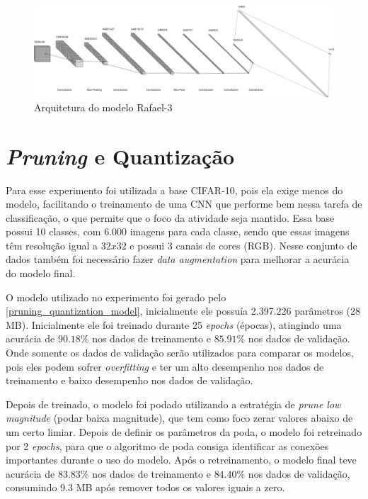 \begin{figure}
	\caption {\label{cap_resultados_rafael_3}Arquitetura do modelo Rafael-3}
	\begin{center}
		\includegraphics[scale=0.50]{Imagens/arch-rafael-3}
	\end{center}
\end{figure}

\section{\textit{Pruning} e Quantização}

Para esse experimento foi utilizada a base CIFAR-10, pois ela exige menos do modelo, facilitando o treinamento de uma
CNN que performe bem nessa tarefa de classificação, o que permite que o foco da atividade seja mantido.
Essa base possui 10 classes, com  6.000 imagens para cada classe, sendo que essas imagens têm resolução igual a
$32x32$ e possui 3 canais de cores (RGB). Nesse conjunto de dados também foi necessário fazer
\textit{data augmentation} para melhorar a acurácia do modelo final.

O modelo utilizado no experimento foi gerado pelo \autoref{pruning_quantization_model}, inicialmente ele possuía
2.397.226 parâmetros (28 MB). Inicialmente ele foi treinado durante 25 \textit{epochs} (épocas), atingindo
uma acurácia de $90.18\%$ nos dados de treinamento e $85.91\%$ nos dados de validação.
Onde somente os dados de validação serão utilizados para comparar os modelos, pois eles podem sofrer
\textit{overfitting} e ter um alto desempenho nos dados de treinamento e baixo desempenho nos dados de validação.

Depois de treinado, o modelo foi podado utilizando a estratégia de \textit{prune low magnitude}
(podar baixa magnitude), que tem como foco zerar valores abaixo de um certo limiar. Depois de definir os parâmetros da
poda, o modelo foi retreinado por 2 \textit{epochs}, para que o algoritmo de poda consiga identificar as conexões
importantes durante o uso do modelo.
Após o retreinamento, o modelo final teve acurácia de $83.83\%$ nos dados de treinamento e $84.40\%$ nos dados de
validação, consumindo 9.3 MB após remover todos os valores iguais a zero.

